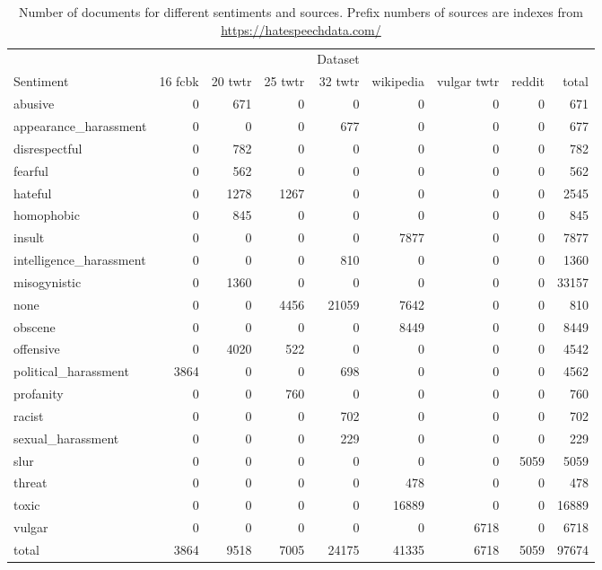 \documentclass[fleqn,moreauthors,10pt]{ds_report}
\begin{document}
\begin{table}[]
\centering
\begin{tabular}{l|rrrrrrr|r}
          & & & & Dataset & & & & \\
Sentiment & 16 fcbk & 20 twtr & 25 twtr & 32 twtr & wikipedia & vulgar twtr & reddit & total \\
\midrule
  abusive &   0 & 671 &   0 &   0 &   0 &   0 &   0                   & 671   \\ 
  appearance\_harassment &   0 &   0 &   0 & 677 &   0 &   0 &   0    & 677   \\ 
  disrespectful &   0 & 782 &   0 &   0 &   0 &   0 &   0             & 782   \\ 
  fearful &   0 & 562 &   0 &   0 &   0 &   0 &   0                   & 562   \\ 
  hateful &   0 & 1278 & 1267 &   0 &   0 &   0 &   0                 & 2545  \\ 
  homophobic &   0 & 845 &   0 &   0 &   0 &   0 &   0                & 845   \\ 
  insult &   0 &   0 &   0 &   0 & 7877 &   0 &   0                   & 7877  \\ 
  intelligence\_harassment &   0 &   0 &   0 & 810 &   0 &   0 &   0  & 1360  \\ 
  misogynistic &   0 & 1360 &   0 &   0 &   0 &   0 &   0             & 33157 \\ 
  none &   0 &   0 & 4456 & 21059 & 7642 &   0 &   0                  & 810   \\ 
  obscene &   0 &   0 &   0 &   0 & 8449 &   0 &   0                  & 8449  \\ 
  offensive &   0 & 4020 & 522 &   0 &   0 &   0 &   0                & 4542  \\ 
  political\_harassment & 3864 &   0 &   0 & 698 &   0 &   0 &   0    & 4562  \\ 
  profanity &   0 &   0 & 760 &   0 &   0 &   0 &   0                 & 760   \\ 
  racist &   0 &   0 &   0 & 702 &   0 &   0 &   0                    & 702   \\ 
  sexual\_harassment &   0 &   0 &   0 & 229 &   0 &   0 &   0        & 229   \\ 
  slur &   0 &   0 &   0 &   0 &   0 &   0 & 5059                     & 5059  \\ 
  threat &   0 &   0 &   0 &   0 & 478 &   0 &   0                    & 478   \\ 
  toxic &   0 &   0 &   0 &   0 & 16889 &   0 &   0                   & 16889 \\ 
  vulgar &   0 &   0 &   0 &   0 &   0 & 6718 &   0                   & 6718  \\ 
  \bottomrule
  total & 3864 & 9518 & 7005 & 24175 & 41335 & 6718 & 5059            & 97674 \\
\end{tabular}
\caption{Number of documents for different sentiments and sources. Prefix numbers of sources are indexes from \url{https://hatespeechdata.com/}}
\label{tab:sentiment-source}
\end{table}

\newpage


\end{document}
